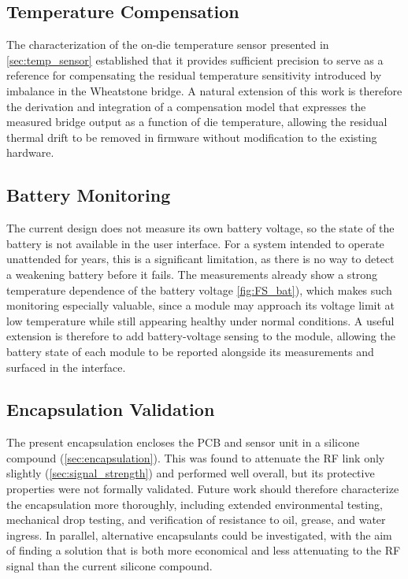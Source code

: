 \subsection{Temperature Compensation}
The characterization of the on-die temperature sensor presented in \cref{sec:temp_sensor} established that it provides sufficient precision to serve as a reference for compensating the residual temperature sensitivity introduced by imbalance in the Wheatstone bridge. A natural extension of this work is therefore the derivation and integration of a compensation model that expresses the measured bridge output as a function of die temperature, allowing the residual thermal drift to be removed in firmware without modification to the existing hardware. 

\subsection{Battery Monitoring}
The current design does not measure its own battery voltage, so the state of the battery is not available in the user interface. For a system intended to operate unattended for years, this is a significant limitation, as there is no way to detect a weakening battery before it fails. The measurements already show a strong temperature dependence of the battery voltage  \cref{fig:FS_bat}), which makes such monitoring especially valuable, since a module may approach its voltage limit at low temperature while still appearing healthy under normal conditions. A useful extension is therefore to add battery-voltage sensing to the module, allowing the battery state of each module to be reported alongside its measurements and surfaced in the interface.

\subsection{Encapsulation Validation}
The present encapsulation encloses the PCB and sensor unit in a silicone compound (\cref{sec:encapsulation}). This was found to attenuate the RF link only slightly (\cref{sec:signal_strength}) and performed well overall, but its protective properties were not formally validated. Future work should therefore characterize the encapsulation more thoroughly, including extended environmental testing, mechanical drop testing, and verification of resistance to oil, grease, and water ingress. In parallel, alternative encapsulants could be investigated, with the aim of finding a solution that is both more economical and less attenuating to the RF signal than the current silicone compound.

